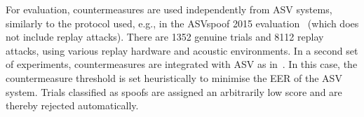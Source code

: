 For evaluation, countermeasures are used independently from ASV systems, similarly to the protocol used, e.g., in the ASVspoof 2015 evaluation~\cite{Wu2015} (which does not include replay attacks).  There are 1352 genuine trials and 8112 replay attacks, using various replay hardware and acoustic environments.  
In a second set of experiments, countermeasures are integrated with ASV as in~\cite{Alegre2013a}. In this case, the countermeasure threshold is set heuristically to minimise the EER of the ASV system. Trials classified as spoofs are assigned an arbitrarily low score and are thereby rejected automatically.
